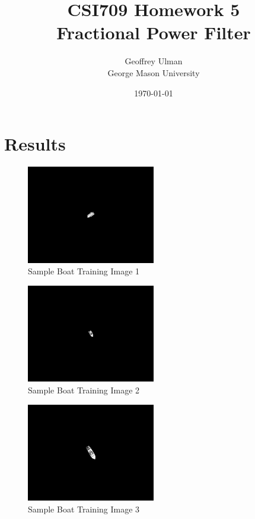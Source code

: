 \documentclass[12pt]{article}
\begin{document}
\title{CSI709 Homework 5 \\
Fractional Power Filter}
\author{
        Geoffrey Ulman \\
        George Mason University\\
}
\date{\today}

\maketitle

\section{Results}

\begin{figure}
\centering
\includegraphics[width=0.50\textwidth]{plotBoat1.png}
\caption{Sample Boat Training Image 1}
\label{boats1}
\end{figure}

\begin{figure}
\centering
\includegraphics[width=0.50\textwidth]{plotBoat2.png}
\caption{Sample Boat Training Image 2}
\label{boats2}
\end{figure}

\begin{figure}
\centering
\includegraphics[width=0.50\textwidth]{plotBoat3.png}
\caption{Sample Boat Training Image 3}
\label{boats3}
\end{figure}
\end{document}
